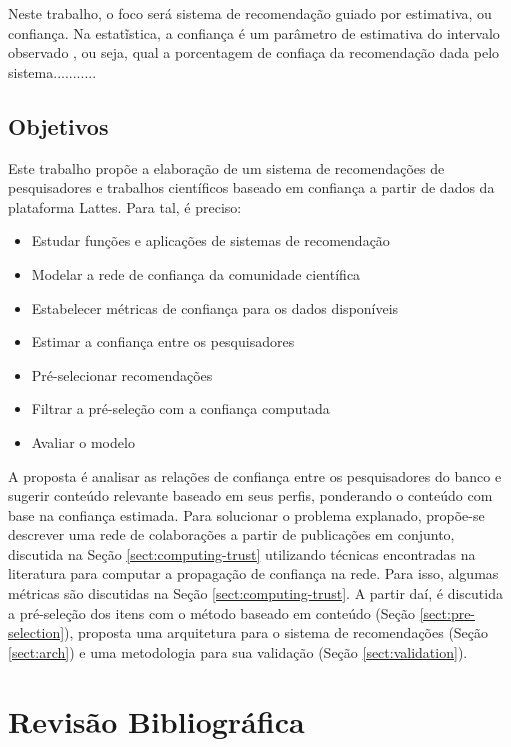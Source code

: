 \documentclass[12pt]{article}
\begin{document}
Neste trabalho, o foco será sistema de recomendação guiado por estimativa, ou confiança. Na estatĩstica, a confiança é um parâmetro
de estimativa do intervalo observado \cite{}, ou seja, qual a porcentagem de confiaça da recomendação dada pelo sistema...........

\subsection{Objetivos}

Este trabalho propõe a elaboração de um sistema de recomendações de pesquisadores e trabalhos científicos baseado 
em confiança a partir de dados da plataforma Lattes. Para tal, é preciso:

\begin{itemize}
  \item Estudar funções e aplicações de sistemas de recomendação
  \item Modelar a rede de confiança da comunidade científica
  \item Estabelecer métricas de confiança para os dados disponíveis
  \item Estimar a confiança entre os pesquisadores 
  \item Pré-selecionar recomendações
  \item Filtrar a pré-seleção com a confiança computada
  \item Avaliar o modelo
\end{itemize}

A proposta é analisar as relações de confiança entre os pesquisadores do banco e sugerir conteúdo relevante baseado em seus perfis, 
ponderando o conteúdo com base na confiança estimada. Para solucionar o problema explanado, propõe-se descrever uma rede de colaborações 
a partir de publicações em conjunto, discutida na Seção \ref{sect:computing-trust} utilizando técnicas encontradas na literatura 
para computar a propagação de confiança na rede. Para isso, algumas métricas são discutidas na Seção \ref{sect:computing-trust}. 
A partir daí, é discutida a pré-seleção dos itens com o método baseado em conteúdo (Seção \ref{sect:pre-selection}), proposta uma 
arquitetura para o sistema de recomendações (Seção \ref{sect:arch}) e uma metodologia para sua validação 
(Seção \ref{sect:validation}).

\section{Revisão Bibliográfica}
\end{document}
